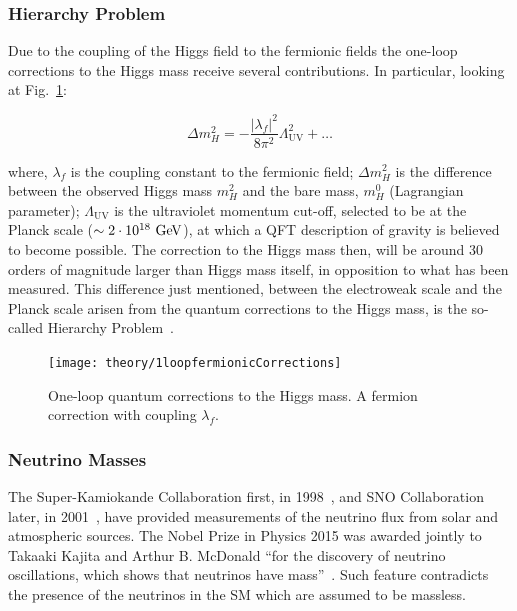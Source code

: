 		\subsubsection*{Hierarchy Problem}

			Due to the coupling of the Higgs field to the fermionic fields the one-loop corrections to the Higgs mass receive several contributions. In particular, looking at Fig.~\ref{fig:higgs_f_coupling}: 

			\begin{equation}
				\label{eq:mH_fermionic_contribution}
				\Delta m_H^2 = - \frac{ | \lambda_f  |^2}{8 \pi ^2} \Lambda_{\mathrm{UV}}^2 + \dots 
			\end{equation}
 	
			\noindent where, $\lambda_f$ is the coupling constant to the fermionic field; $\Delta m_H^2$ is the difference between the observed Higgs mass $m_H^2$ and the bare mass, $m_H^0$ (Lagrangian parameter); $\Lambda_{\mathrm{UV}}$ is the ultraviolet momentum cut-off, selected to be at the Planck scale ($\sim 2 \cdot 10^{18} \gev$), at which a QFT description of gravity is believed to become possible. The correction to the Higgs mass then, will be around 30 orders of magnitude larger than Higgs mass itself, in opposition to what has been measured. This difference just mentioned, between the electroweak scale and the Planck scale arisen from the quantum corrections to the Higgs mass, is the so-called Hierarchy Problem~\cite{Weinberg1976}.

			\begin{figure}
				\centering
				\texttt{[image: theory/1loopfermionicCorrections]}
				\caption{\label{fig:higgs_f_coupling} One-loop quantum corrections to the Higgs mass. A fermion correction with coupling $\lambda_f$.}
			\end{figure}



		\subsubsection*{Neutrino Masses}

			The Super-Kamiokande Collaboration first, in 1998~\cite{SK1998}, and SNO Collaboration later, in 2001~\cite{SNO2001}, have provided measurements of the neutrino flux from solar and atmospheric sources. 
			The Nobel Prize in Physics 2015 was awarded jointly to Takaaki Kajita and Arthur B. McDonald ``for the discovery of neutrino oscillations, which shows that neutrinos have mass''~\cite{Nobel2015}. Such feature contradicts the presence of the neutrinos in the SM which are assumed to be massless.



